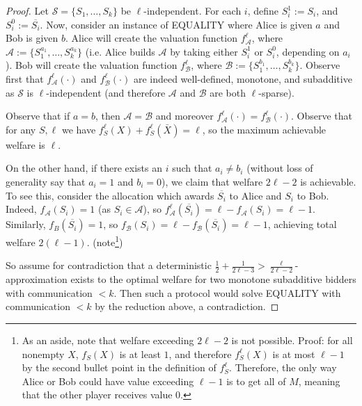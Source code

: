   \begin{proof} Let $\mathcal{S} = \{S_1,\ldots, S_k\}$ be $\ell$-independent. For
    each $i$, define $S_i^1:= S_i$, and $S_i^0 := \overline{S_i}$. Now, consider
    an instance of EQUALITY where Alice is given $a$ and Bob is given $b$. Alice
    will create the valuation function $f^\ell_\mathcal{A}$, where
    $\mathcal{A}:=\{S_1^{a_1},\ldots, S_k^{a_k}\}$ (i.e. Alice builds
    $\mathcal{A}$ by taking either $S_i^1$ or $S_i^0$, depending on $a_i$). Bob
    will create the valuation function $f^\ell_\mathcal{B}$, where
    $\mathcal{B}:=\{S_1^{b_1},\ldots, S_k^{b_k}\}$. Observe first that
    $f^\ell_\mathcal{A}(\cdot)$ and $f^\ell_\mathcal{B}(\cdot)$ are indeed
    well-defined, monotone, and subadditive as $\mathcal{S}$ is $\ell$-independent
    (and therefore $\mathcal{A}$ and $\mathcal{B}$ are both $\ell$-sparse). 

  Observe that if $a = b$, then $\mathcal{A} = \mathcal{B}$ and moreover
  $f^\ell_\mathcal{A}(\cdot) = f^\ell_\mathcal{B}(\cdot)$. Observe that for any
  $S, \ell$ we have $f_S^\ell(X) + f_S^\ell(\bar{X}) =\ell$, so the maximum
  achievable welfare is $\ell$.

  On the other hand, if there exists an $i$ such that $a_i \neq b_i$ (without loss
  of generality say that $a_i = 1$ and $b_i = 0$), we claim that welfare $2\ell-2$
  is achievable. To see this, consider the allocation which awards
  $\overline{S_i}$ to Alice and $S_i$ to Bob. Indeed,
  $f_\mathcal{A}(S_i) = 1$ (as $S_i \in \mathcal{A}$),
  so $f^\ell_\mathcal{A}(\overline{S_i}) = \ell - f_\mathcal A(S_i) = \ell - 1$.
  Similarly, $f_B(\overline{S_i}) = 1$, so 
  $f_\mathcal B(S_i) = \ell - f_\mathcal B (\overline{S_i}) = \ell - 1$,
  achieving total welfare $2(\ell-1)$.
  (note\footnote{
    As an aside, note that welfare exceeding $2\ell-2$ is not possible.
    Proof: for all nonempty $X$, $f_S(X)$ is at
    least $1$, and therefore $f^\ell_S(X)$ is at most $\ell-1$
    by the second bullet point in the definition of $f^\ell_S$.
    Therefore, the only way Alice or Bob could have value exceeding
    $\ell-1$ is to get all of $M$, meaning that the other player receives value
    $0$.
  })

  So assume for contradiction that a deterministic $\frac{1}{2} +
  \frac{1}{2\ell-3} > \frac{\ell}{2\ell-2}$-approximation exists to the optimal
  welfare for two monotone subadditive bidders with communication $< k$. Then such
  a protocol would solve EQUALITY with communication $<k$ by the reduction above,
  a contradiction.  \end{proof}

